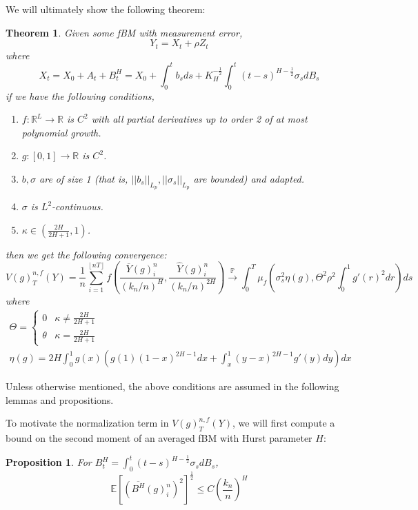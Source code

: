 \documentclass[12pt,letterpaper]{article}
\newtheorem*{theorem}{Theorem}
\newtheorem{prop}{Proposition}
\theoremstyle{definition}
\newcommand{\R}{\mathbb{R}}
\newcommand{\E}{\mathbb{E}}
\begin{document}
We will ultimately show the following theorem:
\begin{theorem}
  Given some fBM with measurement error,
  \begin{equation}
    Y_t = X_t + \rho Z_t
  \end{equation}
  where
  \begin{equation}
    X_t = X_0 + A_t + B_t^H = X_0 + \int_0^tb_sds + K_H^{-\frac{1}{2}}\int_0^t(t-s)^{H - \frac{1}{2}}\sigma_sdB_s
  \end{equation}
  if we have the following conditions, %
  \begin{enumerate}
    \item \(f: \R^L \rightarrow \R\) is \(C^2\) with all partial derivatives up to order 2 of at most polynomial growth.
    \item \(g: [0,1] \rightarrow \R\) is \(C^2\).
    \item \(b, \sigma\) are of size 1 (that is, \(||b_s||_{L_p}, ||\sigma_s||_{L_p}\) are bounded) and adapted.
    \item \(\sigma\) is \(L^2\)-continuous.
    \item \(\kappa \in \left(\frac{2H}{2H+1}, 1\right)\).
  \end{enumerate}
  then we get the following convergence:
  \begin{equation}
    V(g)^{n,f}_T(Y) = \frac{1}{n}\sum_{i=1}^{\left\lfloor nT \right\rfloor}f\left( \frac{\overline{Y}(g)^n_i}{\left( k_n/n \right)^H}, \frac{\widehat{Y}(g)^n_i}{\left( k_n/n \right)^{2H}} \right) \overset{\mathbb{P}}{\rightarrow} \int_0^T \mu_f\left( \sigma_s^2\eta\left( g \right), \Theta^2\rho^2 \int_0^1g'(r)^2dr \right)ds
  \end{equation}
  where
  \begin{gather}
    \Theta =
    \begin{cases}
      0 & \kappa \neq \frac{2H}{2H+1} \\
      \theta &  \kappa = \frac{2H}{2H+1}
    \end{cases} \\
    \eta(g) = 2H\int_0^1g(x)\left(g(1)(1-x)^{2H-1}dx + \int_x^1(y-x)^{2H-1}g'(y)dy\right)dx
  \end{gather}
\end{theorem}
Unless otherwise mentioned, the above conditions are assumed in the following lemmas and propositions.

To motivate the normalization term in \(V(g)_T^{n,f}(Y)\), we will first compute a bound on the second moment of an averaged fBM with Hurst parameter \(H\):
\begin{prop}
  For \(B^H_t = \int_0^t(t-s)^{H - \frac{1}{2}}\sigma_sdB_s\),
  \begin{equation}
    \E\left[ \left(\overline{B^H}(g)^n_i\right)^2 \right]^{\frac{1}{2}} \leq C\left( \frac{k_n}{n} \right)^H
  \end{equation}
\end{prop}
\end{document}
